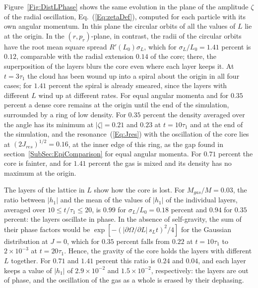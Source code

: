 Figure~\ref{Fig:DistLPhase} shows the same evolution in the plane of the amplitude $\zeta$ of the radial oscillation, Eq.~(\ref{Eq:zetaDef}), computed for each particle with its own angular momentum. In this plane the circular orbits of all the values of $L$ lie at the origin. In the $(r,p_r)$-plane, in contrast, the radii of the circular orbits have the root mean square spread $R'(L_0)\sigma_L$, which for $\sigma_L/L_0 = 1.41$ percent is $0.12$, comparable with the radial extension $0.14$ of the core; there, the superposition of the layers blurs the core even where each layer keeps it. At $t = 3\tau_1$ the cloud has been wound up into a spiral about the origin in all four cases; for $1.41$ percent the spiral is already smeared, since the layers with different $L$ wind up at different rates. For equal angular momenta and for $0.35$ percent a dense core remains at the origin until the end of the simulation, surrounded by a ring of low density. For $0.35$ percent the density averaged over the angle has its minimum at $|\zeta| = 0.21$ and $0.23$ at $t = 10\tau_1$ and at the end of the simulation, and the resonance~(\ref{Eq:Jres}) with the oscillation of the core lies at $(2J_{res})^{1/2} = 0.16$, at the inner edge of this ring, as the gap found in section~\ref{SubSec:EpiComparison} for equal angular momenta. For $0.71$ percent the core is fainter, and for $1.41$ percent the gas is mixed and its density has no maximum at the origin.

The layers of the lattice in $L$ show how the core is lost. For $M_{gas}/M = 0.03$, the ratio between $|h_1|$ and the mean of the values of $|h_1|$ of the individual layers, averaged over $10\leq t/\tau_1\leq 20$, is $0.99$ for $\sigma_L/L_0 = 0.18$ percent and $0.94$ for $0.35$ percent: the layers oscillate in phase. In the absence of self-gravity, the sum of their phase factors would be $\exp[-(|\partial\Omega/\partial L|\, s_L t)^2/4]$ for the Gaussian distribution at $J = 0$, which for $0.35$ percent falls from $0.22$ at $t = 10\tau_1$ to $2\times 10^{-3}$ at $t = 20\tau_1$. Hence, the gravity of the core holds the layers with different $L$ together. For $0.71$ and $1.41$ percent this ratio is $0.24$ and $0.04$, and each layer keeps a value of $|h_1|$ of $2.9\times 10^{-2}$ and $1.5\times 10^{-2}$, respectively: the layers are out of phase, and the oscillation of the gas as a whole is erased by their dephasing.

